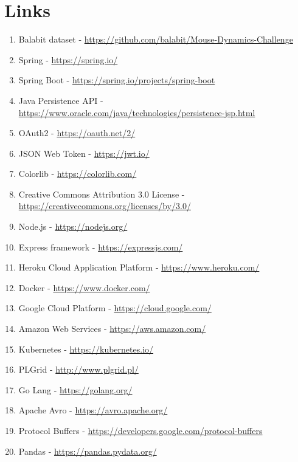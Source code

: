 \section{Links}\label{sec:links}
\begin{enumerate}
    \item Balabit dataset - \url{https://github.com/balabit/Mouse-Dynamics-Challenge}\label{itm:balabit}
    \item Spring - \url{https://spring.io/}\label{itm:spring}
    \item Spring Boot - \url{https://spring.io/projects/spring-boot}\label{itm:spring-boot}
    \item Java Persistence API - \url{https://www.oracle.com/java/technologies/persistence-jsp.html}\label{itm:jpa}
    \item OAuth2 - \url{https://oauth.net/2/}\label{itm:oauth2}
    \item JSON Web Token - \url{https://jwt.io/}\label{itm:jwt}
    \item Colorlib - \url{https://colorlib.com/}\label{itm:colorlib}
    \item Creative Commons Attribution 3.0 License - \url{https://creativecommons.org/licenses/by/3.0/}\label{itm:license}
    \item Node.js - \url{https://nodejs.org/}\label{itm:node}
    \item Express framework - \url{https://expressjs.com/}\label{itm:express}
    \item Heroku Cloud Application Platform - \url{https://www.heroku.com/}\label{itm:heroku}
    \item Docker - \url{https://www.docker.com/}\label{itm:docker}
    \item Google Cloud Platform - \url{https://cloud.google.com/}\label{itm:gcp}
    \item Amazon Web Services - \url{https://aws.amazon.com/}\label{itm:aws}
    \item Kubernetes - \url{https://kubernetes.io/}\label{itm:kubernetes}
    \item PLGrid - \url{http://www.plgrid.pl/}\label{itm:plgrid}
    \item Go Lang - \url{https://golang.org/}\label{itm:golang}
    \item Apache Avro - \url{https://avro.apache.org/}\label{itm:avro}
    \item Protocol Buffers - \url{https://developers.google.com/protocol-buffers}\label{itm:protobuf}
    \item Pandas - \url{https://pandas.pydata.org/}\label{itm:pandas}

\end{enumerate}
